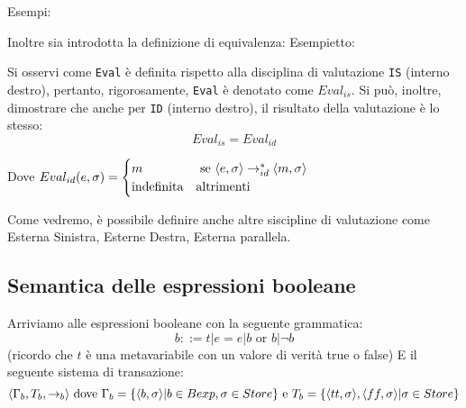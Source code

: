 Esempi:

Inoltre sia introdotta la definizione di equivalenza:
Esempietto:

Si osservi come \texttt{Eval} è definita rispetto alla disciplina di valutazione \texttt{IS} (interno destro), pertanto, rigorosamente, \texttt{Eval} è denotato come $Eval_{is}$. Si può, inoltre, dimostrare che anche per \texttt{ID} (interno destro), il risultato della valutazione è lo stesso:
\[
    Eval_{is} = Eval_{id}    
\]

Dove $Eval_{id}(e,\sigma) = \begin{cases} m & \text{ se }\langle e,\sigma \rangle\to^*_{id} \langle m,\sigma \rangle  \\ \text{indefinita} & \text{altrimenti}\end{cases}$

Come vedremo, è possibile definire anche altre siscipline di valutazione come Esterna Sinistra, Esterne Destra, Esterna parallela.
\subsection{Semantica delle espressioni booleane}
Arriviamo alle espressioni booleane con la seguente grammatica:
\[
    b ::= t|e=e|b\text{ or }b| \lnot b    
\]
(ricordo che $t$ è una metavariabile con un valore di verità true o false)
E il seguente sistema di transazione:
\[
    \langle \Gamma_b, T_b, \to_b \rangle \text{ dove } \Gamma_b = \{\langle b,\sigma \rangle|b\in Bexp, \sigma\in Store\} \text{ e } T_b=\{\langle tt,\sigma \rangle, \langle ff,\sigma \rangle| \sigma\in Store\}    
\]

